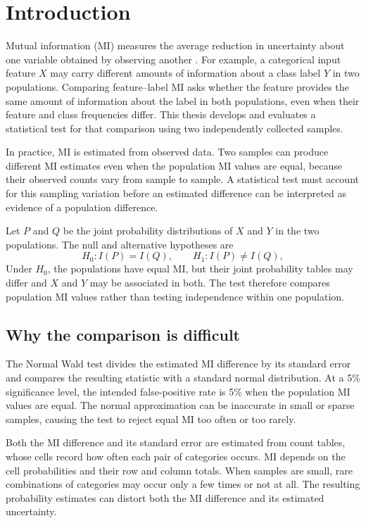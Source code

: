 \chapter{Introduction}
\label{chap:introduction}

Mutual information (MI) measures the average reduction in uncertainty about
one variable obtained by observing another \citep{bossomaier2016}.
For example, a categorical input feature
\(X\) may carry different amounts of information about a class label \(Y\) in two
populations. Comparing feature--label MI asks whether the feature provides
the same amount of information about the label in both populations,
even when their feature and class
frequencies differ. This thesis develops and evaluates a statistical test
for that comparison using two independently collected samples.

In practice, MI is estimated from observed data. Two samples can produce
different MI estimates even when the population MI values are equal,
because their observed counts vary from sample to sample. A statistical
test must account for this sampling variation before an estimated
difference can be interpreted as evidence of a population difference.

Let \(P\) and \(Q\) be the joint probability distributions of \(X\) and
\(Y\) in the two populations. The null and alternative hypotheses are
\begin{equation}
  H_0:I(P)=I(Q),
  \qquad H_1:I(P)\ne I(Q),
  \label{eq:introduction-null}
\end{equation}
Under \(H_0\), the populations have equal MI, but their joint probability
tables may differ and \(X\) and \(Y\) may be associated in both. The test
therefore compares population MI values rather than
testing independence within one population.

\section{Why the comparison is difficult}

The Normal Wald test \citep{wald1943,vanderVaart1998} divides the estimated
MI difference by its standard error and compares the resulting statistic
with a standard normal distribution. At a 5\% significance level, the
intended false-positive rate is 5\% when the population MI values are
equal. The normal
approximation can be inaccurate in small or sparse samples, causing the
test to reject equal MI too often or too rarely.

Both the MI difference and its standard error are estimated from count
tables, whose cells record how often each pair of categories occurs.
MI depends on the cell probabilities and their row and column totals.
When samples are small,
rare combinations of categories may occur only a few times or not at all.
The resulting probability estimates can distort both the MI difference
and its estimated uncertainty.

